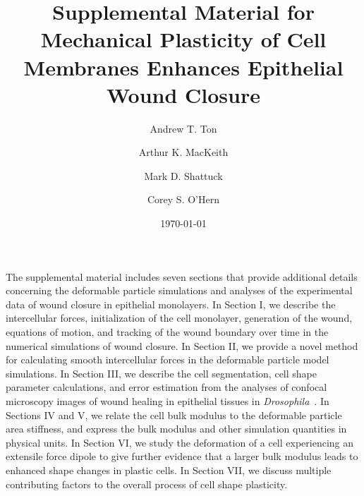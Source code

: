 \documentclass[%
 reprint,
superscriptaddress,
 amsmath,amssymb,
pre,
]{revtex4-2}
\begin{document}

\title{Supplemental Material for \\ Mechanical Plasticity of Cell Membranes Enhances Epithelial Wound Closure}

\author{Andrew T. Ton}
 
\author{Arthur K. MacKeith}
 
\author{Mark D. Shattuck}

\author{Corey S. O'Hern}

\date{\today}

\maketitle

The supplemental material includes seven sections that provide additional details concerning the deformable particle simulations and analyses of the experimental data of wound closure in epithelial monolayers. In Section I, we describe the intercellular forces, initialization of the cell monolayer, generation of the wound, equations of motion, and tracking of the wound boundary over time in the numerical simulations of wound closure. In Section II, we provide a novel method for calculating smooth intercellular forces in the deformable particle model simulations. In Section III, we describe the cell segmentation, cell shape parameter calculations, and error estimation from the analyses of confocal microscopy images of wound healing in epithelial tissues in {\it Drosophila}~\cite{tetley2019tissue}. In Sections IV and V, we relate the cell bulk modulus to the deformable particle area stiffness, and express the bulk modulus and other simulation quantities in physical units. In Section VI, we study the deformation of a cell experiencing an extensile force dipole to give further evidence that a larger bulk modulus leads to enhanced shape changes in plastic cells. In Section VII, we discuss multiple contributing factors to the overall process of cell shape plasticity.
\end{document}

